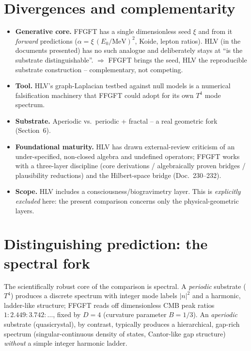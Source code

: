 \section{Divergences and complementarity}

\begin{itemize}
\item \textbf{Generative core.} FFGFT has a single dimensionless seed $\xi$ and from it \emph{forward}
predictions ($\alpha=\xi\,(E_0/\text{MeV})^2$, Koide, lepton ratios). HLV (in the documents presented)
has no such analogue and deliberately stays at \enquote{is the substrate distinguishable}. $\Rightarrow$
FFGFT brings the seed, HLV the reproducible substrate construction -- complementary, not competing.

\item \textbf{Tool.} HLV's graph-Laplacian testbed against null models is a numerical falsification
machinery that FFGFT could adopt for its own $T^4$ mode spectrum.

\item \textbf{Substrate.} Aperiodic vs.\ periodic + fractal -- a real geometric fork (Section~6).

\item \textbf{Foundational maturity.} HLV has drawn external-review criticism of an under-specified,
non-closed algebra and undefined operators; FFGFT works with a three-layer discipline (core
derivations / algebraically proven bridges / plausibility reductions) and the Hilbert-space bridge
(Doc.~230--232).

\item \textbf{Scope.} HLV includes a consciousness/biogravimetry layer. This is \emph{explicitly
excluded} here: the present comparison concerns only the physical-geometric layers.
\end{itemize}

\section{Distinguishing prediction: the spectral fork}

The scientifically robust core of the comparison is spectral. A \emph{periodic} substrate ($T^4$)
produces a discrete spectrum with integer mode labels $|n|^2$ and a harmonic, ladder-like structure;
FFGFT reads off dimensionless CMB peak ratios $1 : 2.449 : 3.742 : \dots$, fixed by $D=4$ (curvature
parameter $B=1/3$). An \emph{aperiodic} substrate (quasicrystal), by contrast, typically produces a
hierarchical, gap-rich spectrum (singular-continuous density of states, Cantor-like gap structure)
\emph{without} a simple integer harmonic ladder.

